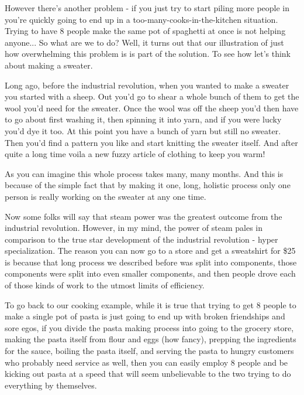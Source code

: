 \documentclass[11pt,a5paper]{book}
\begin{document}
However there's another problem - if you just try to start piling more people in you're quickly going to end up in a too-many-cooks-in-the-kitchen situation. Trying to have 8 people make the same pot of spaghetti at once is not helping anyone... So what are we to do? Well, it turns out that our illustration of just how overwhelming this problem is is part of the solution. To see how let's think about making a sweater.
\newline

Long ago, before the industrial revolution, when you wanted to make a sweater you started with a sheep. Out you'd go to shear a whole bunch of them to get the wool you'd need for the sweater. Once the wool was off the sheep you'd then have to go about first washing it, then spinning it into yarn, and if you were lucky you'd dye it too. At this point you have a bunch of yarn but still no sweater. Then you'd find a pattern you like and start knitting the sweater itself. And after quite a long time voila a new fuzzy article of clothing to keep you warm! 
\newline

As you can imagine this whole process takes many, many months. And this is because of the simple fact that by making it one, long, holistic process only one person is really working on the sweater at any one time. 
\newline

Now some folks will say that steam power was the greatest outcome from the industrial revolution. However, in my mind, the power of steam pales in comparison to the true star development of the industrial revolution - hyper specialization. The reason you can now go to a store and get a sweatshirt for \$25 is because that long process we described before was split into components, those components were split into even smaller components, and then people drove each of those kinds of work to the utmost limits of efficiency.
\newline

To go back to our cooking example, while it is true that trying to get 8 people to make a single pot of pasta is just going to end up with broken friendships and sore egos, if you divide the pasta making process into going to the grocery store, making the pasta itself from flour and eggs (how fancy), prepping the ingredients for the sauce, boiling the pasta itself, and serving the pasta to hungry customers who probably need service as well, then you can easily employ 8 people and be kicking out pasta at a speed that will seem unbelievable to the two trying to do everything by themselves. 
\newline
\end{document}
